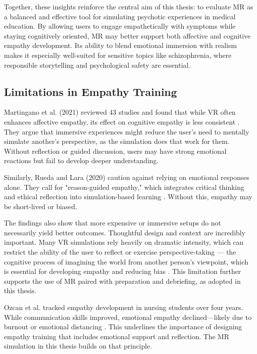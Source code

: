 Together, these insights reinforce the central aim of this thesis: to evaluate MR as a balanced and effective tool for simulating psychotic experiences in medical education. By allowing users to engage empathetically with symptoms while staying cognitively oriented, MR may better support both affective and cognitive empathy development. Its ability to blend emotional immersion with realism makes it especially well-suited for sensitive topics like schizophrenia, where responsible storytelling and psychological safety are essential.


\subsection{Limitations in Empathy Training}

Martingano et al. (2021) reviewed 43 studies and found that while VR often enhances affective empathy, its effect on cognitive empathy is less consistent \cite{Martingano2021}. They argue that immersive experiences might reduce the user's need to mentally simulate another's perspective, as the simulation does that work for them. Without reflection or guided discussion, users may have strong emotional reactions but fail to develop deeper understanding.

Similarly, Rueda and Lara (2020) caution against relying on emotional responses alone. They call for "reason-guided empathy," which integrates critical thinking and ethical reflection into simulation-based learning \cite{Rueda2020}. Without this, empathy may be short-lived or biased.

The findings also show that more expensive or immersive setups do not necessarily yield better outcomes. Thoughtful design and context are incredibly important. Many VR simulations rely heavily on dramatic intensity, which can restrict the ability of the user to reflect or exercise perspective-taking — the cognitive process of imagining the world from another person’s viewpoint, which is essential for developing empathy and reducing bias \cite{Mattsson2024}. This limitation further supports the use of MR paired with preparation and debriefing, as adopted in this thesis.

Ozcan et al. tracked empathy development in nursing students over four years. While communication skills improved, emotional empathy declined—likely due to burnout or emotional distancing \cite{Ozcan2018}. This underlines the importance of designing empathy training that includes emotional support and reflection. The MR simulation in this thesis builds on that principle.

